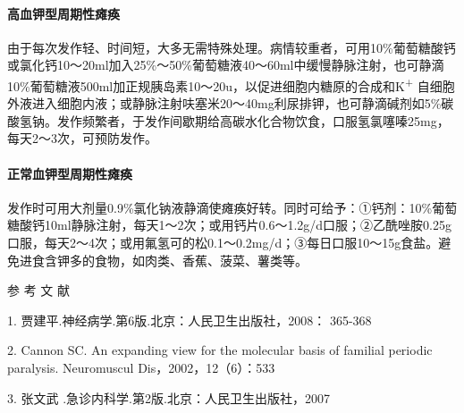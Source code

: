 \paragraph{高血钾型周期性瘫痪}

由于每次发作轻、时间短，大多无需特殊处理。病情较重者，可用10\%葡萄糖酸钙或氯化钙10～20ml加入25\%～50\%葡萄糖液40～60ml中缓慢静脉注射，也可静滴10\%葡萄糖液500ml加正规胰岛素10～20u，以促进细胞内糖原的合成和K\textsuperscript{+}
自细胞外液进入细胞内液；或静脉注射呋塞米20～40mg利尿排钾，也可静滴碱剂如5\%碳酸氢钠。发作频繁者，于发作间歇期给高碳水化合物饮食，口服氢氯噻嗪25mg，每天2～3次，可预防发作。

\paragraph{正常血钾型周期性瘫痪}

发作时可用大剂量0.9\%氯化钠液静滴使瘫痪好转。同时可给予：①钙剂：10\%葡萄糖酸钙10ml静脉注射，每天1～2次；或用钙片0.6～1.2g/d口服；②乙酰唑胺0.25g口服，每天2～4次；或用氟氢可的松0.1～0.2mg/d；③每日口服10～15g食盐。避免进食含钾多的食物，如肉类、香蕉、菠菜、薯类等。

\protect\hypertarget{text00263.html}{}{}

\hypertarget{text00263.htmlux5cux23CHP8-9-4}{}
参 考 文 献

1. 贾建平.神经病学.第6版.北京：人民卫生出版社，2008： 365-368

2. Cannon SC. An expanding view for the molecular basis of familial
periodic paralysis. Neuromuscul Dis，2002，12（6）：533

3. 张文武 .急诊内科学.第2版.北京：人民卫生出版社，2007

\protect\hypertarget{text00264.html}{}{}

